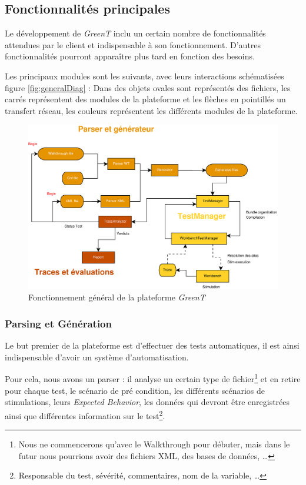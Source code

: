 	\subsection{Fonctionnalités principales}
	Le développement de \textit{GreenT} inclu un certain nombre de fonctionnalités attendues par le client et indispensable à son fonctionnement. D'autres fonctionnalités pourront apparaître plus tard en fonction des besoins.

	Les principaux modules sont les suivants, avec leurs interactions schématisées figure \ref{fig:generalDiag} : 
			Dans des objets ovales sont représentés des fichiers, les carrés représentent des modules de la plateforme et les flèches en pointillés un transfert réseau, les couleurs représentent les différents modules de la plateforme.

			\begin{figure}[H]
			\centering
			\includegraphics[width=16.5cm]{contents/images/generalDiag.eps}
			\caption{Fonctionnement général de la plateforme \textit{GreenT}}
			\label{fig:generalDig}
		\end{figure}	

	\subsubsection{Parsing et Génération}\label{generation}
	Le but premier de la plateforme est d'effectuer des tests automatiques, il est ainsi indispensable d'avoir un système d'automatisation.

	Pour cela, nous avons un parser : il analyse un certain type de fichier\footnote{Nous ne commencerons qu'avec le Walkthrough pour débuter, mais dans le futur nous pourrions avoir des fichiers XML, des bases de données, \ldots} et en retire pour chaque test, le scénario de pré condition, les différents scénarios de stimulations, leurs \textit{Expected Behavior}, les données qui devront être enregistrées ainsi que différentes information sur le test\footnote{Responsable du test, sévérité, commentaires, nom de la variable, \ldots}.

